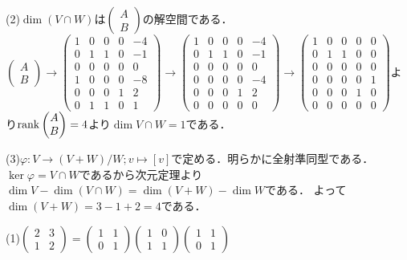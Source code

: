 \documentclass[
		book,
		head_space=20mm,
		foot_space=20mm,
		gutter=10mm,
		line_length=190mm
]{jlreq}
\begin{document}
(2)$\dim(V\cap W)$は$\begin{pmatrix}
A\\B
\end{pmatrix}$の解空間である．
$\begin{pmatrix}
A\\B
\end{pmatrix}\to \begin{pmatrix}
1&0&0&0&-4\\
0&1&1&0&-1\\
0&0&0&0&0\\
1&0&0&0&-8\\
0&0&0&1&2\\
0&1&1&0&1
\end{pmatrix}\to\begin{pmatrix}
1&0&0&0&-4\\
0&1&1&0&-1\\
0&0&0&0&0\\
0&0&0&0&-4\\
0&0&0&1&2\\
0&0&0&0&0
\end{pmatrix}\to\begin{pmatrix}
1&0&0&0&0\\
0&1&1&0&0\\
0&0&0&0&0\\
0&0&0&0&1\\
0&0&0&1&0\\
0&0&0&0&0
\end{pmatrix}$より$\rank \begin{pmatrix}
A\\B
\end{pmatrix}=4$より$\dim V\cap W=1$である．

(3)$\varphi\colon V\rightarrow (V+W)/W;v\mapsto[v]$で定める．明らかに全射準同型である．$\ker \varphi=V\cap W$であるから次元定理より$\dim V-\dim(V\cap W)=\dim(V+W)-\dim W$である．
よって$\dim (V+W)=3-1+2=4$である．

(1)$\begin{pmatrix}
2&3\\
1&2
\end{pmatrix}=\begin{pmatrix}
1&1\\
0&1
\end{pmatrix}\begin{pmatrix}
1&0\\
1&1
\end{pmatrix}\begin{pmatrix}
1&1\\
0&1
\end{pmatrix}$
\end{document}
